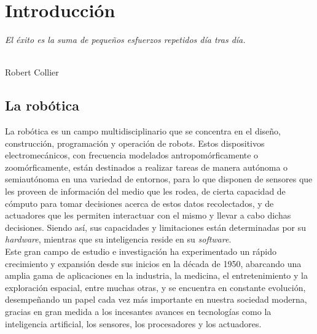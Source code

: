 \chapter{Introducción}
\label{cap:capitulo1}
\setcounter{page}{1}

\begin{flushright}
\begin{minipage}[]{10cm}
\emph{El éxito es la suma de pequeños esfuerzos repetidos día tras día.}\\
\end{minipage}\\

Robert Collier\\
\end{flushright}

\vspace{1cm}



\section{La robótica}
\label{sec:robotica} %

La robótica es un campo multidisciplinario que se concentra en el diseño,
construcción, programación y operación de robots.
Estos dispositivos electromecánicos, con frecuencia modelados
antropomórficamente o zoomórficamente, están destinados a realizar tareas de
manera autónoma o semiautónoma en una variedad de entornos, para lo que disponen
de sensores que les proveen de información del medio que les rodea, de cierta
capacidad de cómputo para tomar decisiones acerca de estos datos recolectados, y
de actuadores que les permiten interactuar con el mismo y llevar a cabo dichas
decisiones.
Siendo así, sus capacidades y limitaciones están determinadas por su
\textit{hardware}, mientras que su inteligencia reside en su \textit{software}.
\\

Este gran campo de estudio e investigación ha experimentado un rápido
crecimiento y expansión desde sus inicios en la década de 1950, abarcando una
amplia gama de aplicaciones en la industria, la medicina, el entretenimiento y
la exploración espacial, entre muchas otras, y se encuentra en constante
evolución, desempeñando un papel cada vez más importante en nuestra sociedad
moderna, gracias en gran medida a los incesantes avances en tecnologías como la
inteligencia artificial, los sensores, los procesadores y los actuadores.



